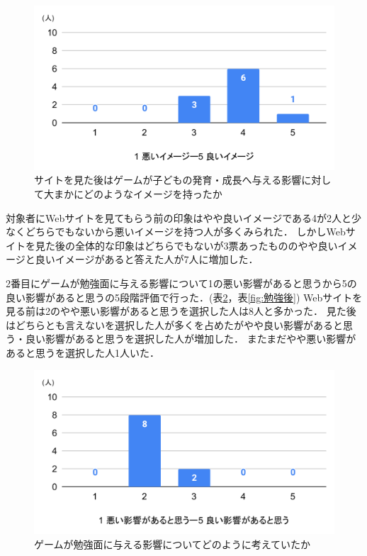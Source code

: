 \documentclass[12pt,a4j,titlepage]{ltjsarticle}
\begin{document}
\begin{figure}[H]
 \begin{center}
  \includegraphics[keepaspectratio, scale=0.5]{印象後.pdf}
 \end{center}
 \caption{サイトを見た後はゲームが子どもの発育・成長へ与える影響に対して大まかにどのようなイメージを持ったか}
 \label{fig:見た後印象}
\end{figure}

対象者にWebサイトを見てもらう前の印象はやや良いイメージである4が2人と少なくどちらでもないから悪いイメージを持つ人が多くみられた．
しかしWebサイトを見た後の全体的な印象はどちらでもないが3票あったもののやや良いイメージと良いイメージがあると答えた人が7人に増加した．

2番目にゲームが勉強面に与える影響について1の悪い影響があると思うから5の良い影響があると思うの5段階評価で行った．(表\ref{fig:勉強前}，表\ref{fig:勉強後})
Webサイトを見る前は2のやや悪い影響があると思うを選択した人は8人と多かった．
見た後はどちらとも言えないを選択した人が多くを占めたがやや良い影響があると思う・良い影響があると思うを選択した人が増加した．
またまだやや悪い影響があると思うを選択した人1人いた．

\begin{figure}[H]
 \begin{center}
  \includegraphics[keepaspectratio, scale=0.5]{勉強前.pdf}
 \end{center}
 \caption{ゲームが勉強面に与える影響についてどのように考えていたか}
 \label{fig:勉強前}
\end{figure}
\end{document}
